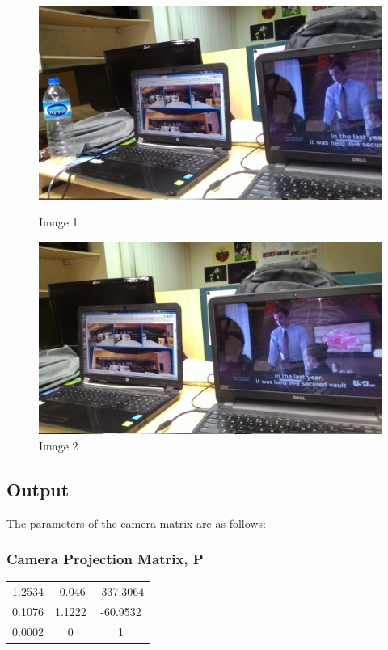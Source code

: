\documentclass[12pt]{article}
\begin{document}
\begin{figure}[h]
\centering
\begin{minipage}{0.6\textwidth}
\centering
\includegraphics[scale = 0.067]{pt1.jpg}
\caption{Image 1}
\label{fig:Image 1}
\end{minipage}%
\begin{minipage}{.5\textwidth}
\centering
\includegraphics[scale = 0.067]{pt2.jpg}
\caption{Image 2}
\label{fig:Image 2}
\end{minipage}%
\end{figure}
\clearpage

\subsection{Output}

The parameters of the camera matrix are as follows:
\subsubsection{Camera Projection Matrix, P} 
\begin{tabular}{|c|c|c|}
\hline

  1.2534 &  -0.046 &  -337.3064  \\ 
 0.1076 &  1.1222 &  -60.9532  \\ 
 0.0002 &  0 &  1  \\ 

\hline
\end{tabular}
             
\end{document}
